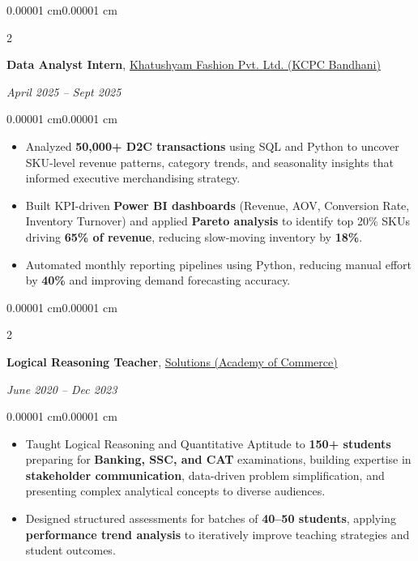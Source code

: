 \documentclass[10pt, letterpaper]{article}
\newenvironment{highlights}{
    \begin{itemize}[
        topsep=0.10 cm,
        parsep=0.10 cm,
        partopsep=0pt,
        itemsep=0pt,
        leftmargin=10pt
    ]
}{
    \end{itemize}
}
\newenvironment{onecolentry}{
    \begin{adjustwidth}{0.00001 cm}{0.00001 cm}
}{
    \end{adjustwidth}
}
\newenvironment{twocolentry}[2][]{
    \onecolentry
    \def\secondColumn{#2}
    \setcolumnwidth{\fill, 4.5 cm}
    \begin{paracol}{2}
}{
    \switchcolumn \raggedleft \secondColumn
    \end{paracol}
    \endonecolentry
}
\begin{document}
\begin{twocolentry}{\textit{April 2025 -- Sept 2025}}
\textbf{Data Analyst Intern}, \textcolor{myblue}{\underline{Khatushyam Fashion Pvt. Ltd. (KCPC Bandhani)}} \kern 2pt \href{https://drive.google.com/file/d/1kYHlutb7SgPZy7kuYSGTyOVHQhtVsAyp/view?usp=drive_link}{\textcolor{myblue}{}}
\end{twocolentry}

\vspace{0.06cm}

\begin{onecolentry}
\begin{highlights}
\item Analyzed \textbf{50,000+ D2C transactions} using SQL and Python to uncover SKU-level revenue patterns, category trends, and seasonality insights that informed executive merchandising strategy.
\item Built KPI-driven \textbf{Power BI dashboards} (Revenue, AOV, Conversion Rate, Inventory Turnover) and applied \textbf{Pareto analysis} to identify top 20\% SKUs driving \textbf{65\% of revenue}, reducing slow-moving inventory by \textbf{18\%}.
\item Automated monthly reporting pipelines using Python, reducing manual effort by \textbf{40\%} and improving demand forecasting accuracy.
\end{highlights}
\end{onecolentry}

\vspace{0.15cm}

\begin{twocolentry}{\textit{June 2020 -- Dec 2023}}
\textbf{Logical Reasoning Teacher}, \textcolor{myblue}{\underline{Solutions (Academy of Commerce)}} 
\end{twocolentry}

\vspace{0.06cm}

\begin{onecolentry}
\begin{highlights}
\item Taught Logical Reasoning and Quantitative Aptitude to \textbf{150+ students} preparing for \textbf{Banking, SSC, and CAT} examinations, building expertise in \textbf{stakeholder communication}, data-driven problem simplification, and presenting complex analytical concepts to diverse audiences.
\item Designed structured assessments for batches of \textbf{40--50 students}, applying \textbf{performance trend analysis} to iteratively improve teaching strategies and student outcomes.
\end{highlights}
\end{onecolentry}
\end{document}
